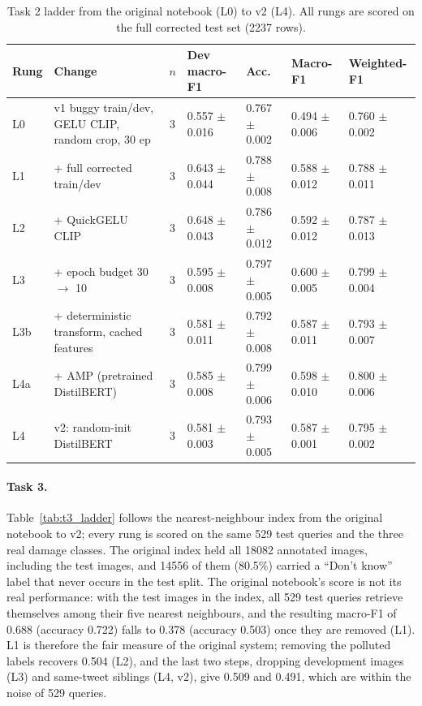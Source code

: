 \begin{table}[t]
\centering
\footnotesize
\caption{Task 2 ladder from the original notebook (L0) to v2 (L4). All rungs are scored on the full corrected test set (2237 rows).}
\label{tab:t2_ladder}
\begin{tabular}{llcllll}
\toprule
Rung & Change & $n$ & Dev macro-F1 & Acc. & Macro-F1 & Weighted-F1 \\
\midrule
L0 & v1 buggy train/dev, GELU CLIP, random crop, 30 ep & 3 & 0.557 $\pm$ 0.016 & 0.767 $\pm$ 0.002 & 0.494 $\pm$ 0.006 & 0.760 $\pm$ 0.002 \\
L1 & + full corrected train/dev & 3 & 0.643 $\pm$ 0.044 & 0.788 $\pm$ 0.008 & 0.588 $\pm$ 0.012 & 0.788 $\pm$ 0.011 \\
L2 & + QuickGELU CLIP & 3 & 0.648 $\pm$ 0.043 & 0.786 $\pm$ 0.012 & 0.592 $\pm$ 0.012 & 0.787 $\pm$ 0.013 \\
L3 & + epoch budget 30 $\to$ 10 & 3 & 0.595 $\pm$ 0.008 & 0.797 $\pm$ 0.005 & 0.600 $\pm$ 0.005 & 0.799 $\pm$ 0.004 \\
L3b & + deterministic transform, cached features & 3 & 0.581 $\pm$ 0.011 & 0.792 $\pm$ 0.008 & 0.587 $\pm$ 0.011 & 0.793 $\pm$ 0.007 \\
L4a & + AMP (pretrained DistilBERT) & 3 & 0.585 $\pm$ 0.008 & 0.799 $\pm$ 0.006 & 0.598 $\pm$ 0.010 & 0.800 $\pm$ 0.006 \\
L4 & v2: random-init DistilBERT & 3 & 0.581 $\pm$ 0.003 & 0.793 $\pm$ 0.005 & 0.587 $\pm$ 0.001 & 0.795 $\pm$ 0.002 \\
\bottomrule
\end{tabular}
\end{table}

\paragraph{Task 3.}
Table~\ref{tab:t3_ladder} follows the nearest-neighbour index from the original notebook to v2; every rung is scored on the same 529 test queries and the three real damage classes.
The original index held all 18082 annotated images, including the test images, and 14556 of them (80.5\%) carried a ``Don't know'' label that never occurs in the test split.
The original notebook's score is not its real performance: with the test images in the index, all 529 test queries retrieve themselves among their five nearest neighbours, and the resulting macro-F1 of 0.688 (accuracy 0.722) falls to 0.378 (accuracy 0.503) once they are removed (L1).
L1 is therefore the fair measure of the original system; removing the polluted labels recovers 0.504 (L2), and the last two steps, dropping development images (L3) and same-tweet siblings (L4, v2), give 0.509 and 0.491, which are within the noise of 529 queries.

